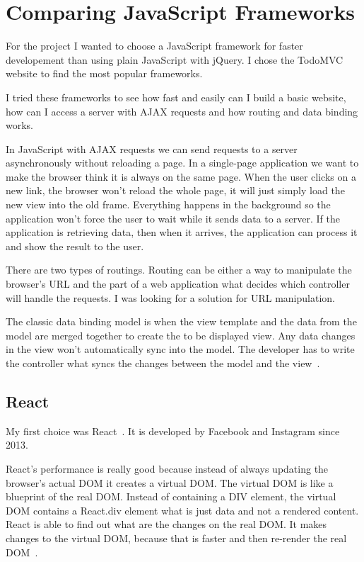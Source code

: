 \chapter{Comparing JavaScript Frameworks}

For the project I wanted to choose a JavaScript framework for faster developement than using plain JavaScript with jQuery. I chose the TodoMVC~\cite{TodoMVC} website to find the most popular frameworks.

I tried these frameworks to see how fast and easily can I build a basic website, how can I access a server with AJAX requests and how routing and data binding works.

In JavaScript with AJAX requests we can send requests to a server asynchronously without reloading a page. In a single-page application we want to make the browser think it is always on the same page. When the user clicks on a new link, the browser won't reload the whole page, it will just simply load the new view into the old frame. Everything happens in the background so the application won't force the user to wait while it sends data to a server. If the application is retrieving data, then when it arrives, the application can process it and show the result to the user.

There are two types of routings. Routing can be either a way to manipulate the browser's URL and the part of a web application what decides which controller will handle the requests. I was looking for a solution for URL manipulation.

The classic data binding model is when the view template and the data from the model are merged together to create the to be displayed view. Any data changes in the view won't automatically sync into the model. The developer has to write the controller what syncs the changes between the model and the view~\cite{Angular-Developer-DataBinding}.


\section{React}

My first choice was React~\cite{React}. It is developed by Facebook and Instagram since 2013.

React's performance is really good because instead of always updating the browser's actual DOM it creates a virtual DOM. The virtual DOM is like a blueprint of the real DOM. Instead of containing a DIV element, the virtual DOM contains a React.div element what is just data and not a rendered content. React is able to find out what are the changes on the real DOM. It makes changes to the virtual DOM, because that is faster and then re-render the real DOM~\cite{React-Virtual-DOM}.

